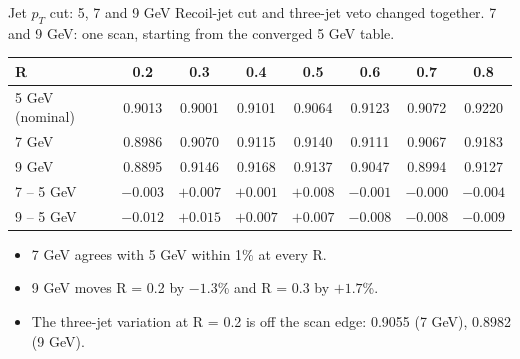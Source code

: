 \documentclass[aspectratio=169,10pt]{beamer}
\begin{document}
\begin{frame}{Jet $p_T$ cut: 5, 7 and 9 GeV}
  \small
  Recoil-jet cut and three-jet veto changed together. 7 and 9 GeV: one scan, starting from the converged 5 GeV table.
  \vspace{0.5em}

  \centering
  \begin{tabular}{lccccccc}
    \toprule
    R & 0.2 & 0.3 & 0.4 & 0.5 & 0.6 & 0.7 & 0.8 \\
    \midrule
    5 GeV (nominal) & 0.9013 & 0.9001 & 0.9101 & 0.9064 & 0.9123 & 0.9072 & 0.9220 \\
    7 GeV & 0.8986 & 0.9070 & 0.9115 & 0.9140 & 0.9111 & 0.9067 & 0.9183 \\
    9 GeV & 0.8895 & 0.9146 & 0.9168 & 0.9137 & 0.9047 & 0.8994 & 0.9127 \\
    \midrule
    7 -- 5 GeV & $-0.003$ & $+0.007$ & $+0.001$ & $+0.008$ & $-0.001$ & $-0.000$ & $-0.004$ \\
    9 -- 5 GeV & $-0.012$ & $+0.015$ & $+0.007$ & $+0.007$ & $-0.008$ & $-0.008$ & $-0.009$ \\
    \bottomrule
  \end{tabular}
  \vspace{0.6em}
  \raggedright
  \begin{itemize}
    \item 7 GeV agrees with 5 GeV within 1\% at every R.
    \item 9 GeV moves R = 0.2 by $-1.3$\% and R = 0.3 by $+1.7$\%.
    \item The three-jet variation at R = 0.2 is off the scan edge: 0.9055 (7 GeV), 0.8982 (9 GeV).
  \end{itemize}
\end{frame}
\end{document}
